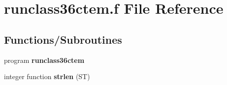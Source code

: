 \hypertarget{runclass36ctem_8f}{}\section{runclass36ctem.\+f File Reference}
\label{runclass36ctem_8f}
\subsection*{Functions/\+Subroutines}
\begin{DoxyCompactItemize}
\item 
\hypertarget{runclass36ctem_8f_a6d56d6301df42923fa1e8aa2e6c02ec3}{}program {\bfseries runclass36ctem}\label{runclass36ctem_8f_a6d56d6301df42923fa1e8aa2e6c02ec3}

\item 
\hypertarget{runclass36ctem_8f_ae665ea752226de365786f295628b2f4f}{}integer function {\bfseries strlen} (S\+T)\label{runclass36ctem_8f_ae665ea752226de365786f295628b2f4f}

\end{DoxyCompactItemize}
